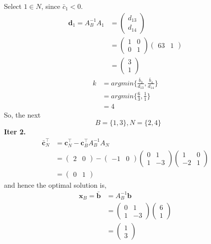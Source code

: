 \documentclass[11pt]{article}
\theoremstyle{remark}
\newcommand{\bx}{\mathbf{x}}
\newcommand{\bd}{\mathbf{d}}
\newcommand{\bc}{\mathbf{c}}
\begin{document}
\begin{itemize}
Select $1 \in N$, since $\bar{c}_1 < 0$.
\begin{align*}
\bd_1 = A_B^{-1}A_1&= \begin{pmatrix}
d_{13} \\
d_{14}
\end{pmatrix} &\\
&= \begin{pmatrix}
1 & 0 \\
0 & 1
\end{pmatrix}
\begin{pmatrix}
63& 1
\end{pmatrix} &\\
&=  \begin{pmatrix}
3 \\
1
\end{pmatrix} 
\end{align*}
\begin{align*}
k&=argmin\{\frac{\bar{b}_3}{d_{13}},\frac{\bar{b}_4}{d_{14}}\} &\\
&=argmin\{\frac{6}{3},\frac{1}{1}\} &\\
&= 4
\end{align*}
So, the next
$$B=\{1,3\},N=\{2,4\}$$
    \textbf{Iter 2.}
    \begin{align*}
    \bar{\bc}_N^\intercal&=\bc^\intercal_N-\bc^\intercal_B A_B^{-1} A_N &\\
    &= 
\begin{pmatrix}
2 & 0
\end{pmatrix} -
\begin{pmatrix}
-1 & 0
\end{pmatrix}
\begin{pmatrix}
0 & 1 \\
1 & -3
\end{pmatrix}
\begin{pmatrix}
1 & 0 \\
-2 & 1
\end{pmatrix} &\\
&= \begin{pmatrix}
0 & 1
\end{pmatrix}
    \end{align*}
and hence the optimal solution is,
 \begin{align*}
\bx_B=\bar{\textbf{b}} &= A_B^{-1}\textbf{b} &\\
&= \begin{pmatrix}
0 & 1 \\
1 & -3
\end{pmatrix}
\begin{pmatrix}
6 \\ 1
\end{pmatrix} &\\
&= \begin{pmatrix}
1 \\ 3
\end{pmatrix}
 \end{align*}


\end{itemize}
\end{document}
